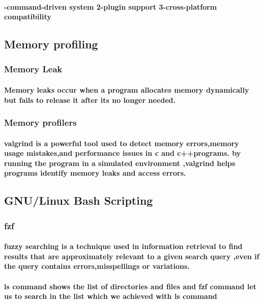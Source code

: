 \documentclass[titlepage]{article}
\begin{document}
 \paragraph{-command-driven system 2-plugin support 3-cross-platform compatibility}
 \subsection {Memory profiling}
 \subsubsection{Memory Leak}
 \paragraph{Memory leaks occur when a program allocates memory dynamically but fails to release it after its no longer needed.}
 \subsubsection{Memory profilers }
 \paragraph{valgrind is a powerful tool used to detect memory errors,memory usage mistakes,and performance issues in c and c++programs.
 by running the program in a simulated environment ,valgrind helps programs identify memory leaks and access errors.}
 \subsection{GNU/Linux Bash Scripting}
 \subsubsection{fzf}
 \paragraph{fuzzy searching is a technique used in information retrieval to find results that are
  approximately relevant to a given search query ,even if the query contains errors,misspellings or variations.}
  \paragraph{ls command shows the list of directories and files and fzf
   command let us to search in the list which we achieved with ls command}
\end{document}
